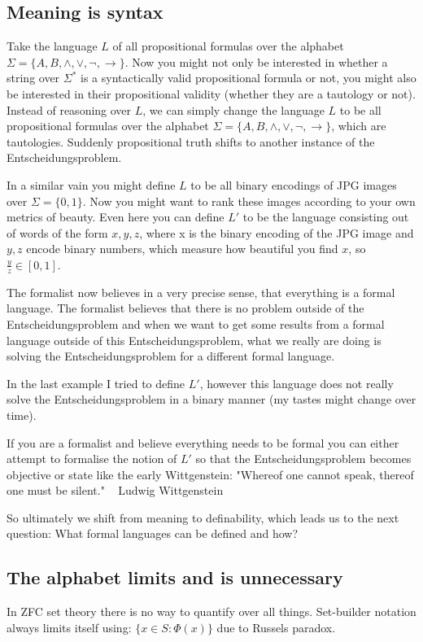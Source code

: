 \subsection{Meaning is syntax}
Take the language $L$ of all propositional formulas over the alphabet $\Sigma = \{A,B,\wedge,\vee,\neg, \rightarrow\}$. Now you might not only be interested in whether a string over $\Sigma^*$ is a syntactically valid propositional formula or not, you might also be interested in their propositional validity (whether they are a tautology or not). Instead of reasoning over $L$, we can simply change the language $L$ to be all propositional formulas over the alphabet $\Sigma = \{A,B,\wedge,\vee,\neg,\rightarrow\}$, which are tautologies. Suddenly propositional truth shifts to another instance of the Entscheidungsproblem.

In a similar vain you might define $L$ to be all binary encodings of JPG images over $\Sigma = \{0,1\}$. Now you might want to rank these images according to your own metrics of beauty. Even here you can define $L'$ to be the language consisting out of words of the form $x,y,z$, where x is the binary encoding of the JPG image and $y,z$ encode binary numbers, which measure how beautiful you find $x$, so $\frac{y}{z} \in [0,1]$.

The formalist now believes in a very precise sense, that everything is a formal language. The formalist believes that there is no problem outside of the Entscheidungsproblem and when we want to get some results from a formal language outside of this Entscheidungsproblem, what we really are doing is solving the Entscheidungsproblem for a different formal language. 

In the last example I tried to define $L'$, however this language does not really solve the Entscheidungsproblem in a binary manner (my tastes might change over time).

If you are a formalist and believe everything needs to be formal you can either attempt to formalise the notion of $L'$ so that the Entscheidungsproblem becomes objective or state like the early Wittgenstein:
"Whereof one cannot speak, thereof one must be silent." ~ Ludwig Wittgenstein

So ultimately we shift from meaning to definability, which leads us to the next question: What formal languages can be defined and how?
 
\iffalse
\subsection{The alphabet limits and is unnecessary}
In ZFC set theory there is no way to quantify over all things. Set-builder notation always limits itself using:
$\{x \in S : \Phi(x)\}$ due to Russels paradox.

